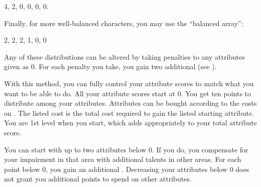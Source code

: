             4, 2, 0, 0, 0, 0.

            Finally, for more well-balanced characters, you may use the ``balanced array'':

            2, 2, 2, 1, 0, 0

            Any of these distributions can be altered by taking penalties to any attributes given as 0.
            For each penalty you take, you gain two additional  (see ).

                With this method, you can fully control your attribute scores to match what you want to be able to do.
                All your attribute scores start at 0.
                You get ten points to distribute among your attributes.
                Attributes can be bought according to the costs on .
                The listed cost is the total cost required to gain the listed starting attribute.
                You are 1st level when you start, which adds appropriately to your total attribute score.

                \label{Impaired Attributes}
                You can start with up to two attributes below 0.
                If you do, you compensate for your impairment in that area with additional talents in other areas.
                For each point below 0, you gain an additional .
                Decreasing your attributes below 0 does not grant you additional points to spend on other attributes.


